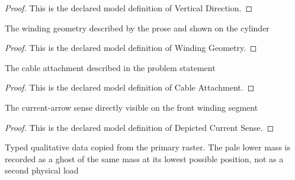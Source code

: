 \begin{proof}
  This is the declared model definition of Vertical Direction.
\end{proof}
\begin{definition}
  \label{def:physics:phyx-mini-0954:phyxminiproblems-problemphyxmini0954-windinggeometry}
  The winding geometry described by the prose and shown on the cylinder
\end{definition}
\begin{proof}
  This is the declared model definition of Winding Geometry.
\end{proof}
\begin{definition}
  \label{def:physics:phyx-mini-0954:phyxminiproblems-problemphyxmini0954-cableattachment}
  The cable attachment described in the problem statement
\end{definition}
\begin{proof}
  This is the declared model definition of Cable Attachment.
\end{proof}
\begin{definition}
  \label{def:physics:phyx-mini-0954:phyxminiproblems-problemphyxmini0954-depictedcurrentsense}
  The current-arrow sense directly visible on the front winding segment
\end{definition}
\begin{proof}
  This is the declared model definition of Depicted Current Sense.
\end{proof}
\begin{definition}
  \label{def:physics:phyx-mini-0954:phyxminiproblems-problemphyxmini0954-magneticliftfigure}
  Typed qualitative data copied from the primary raster. The pale lower mass is recorded as a ghost of the same mass at its lowest possible position, not as a second physical load
\end{definition}
